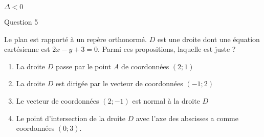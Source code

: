 \begin{enumerate}[label=\alph*.]
     \begin{center}
          \begin{extern} %
          \end{extern}
     \end{center}
     \begin{center}
          $ \Delta <0$
     \end{center}
     \newpar
\end{enumerate}
\begin{h2}Question 5\end{h2}
Le plan est rapporté à un repère orthonormé.
\newpar
$D$ est une droite dont une équation cartésienne est $2x-y+3=0$.
\newpar
Parmi ces propositions, laquelle est juste ?
\newpar
\begin{enumerate}[label=\alph*.]
     \item
     La droite $D$ passe par le point $A$ de coordonnées $( 2;1 )$
     \item
     La droite $D$ est dirigée par le vecteur de coordonnées $(  - 1;2 )$
     \item
     Le vecteur de coordonnées $( 2; - 1 )$ est normal à la droite $D$
     \item
     Le point d'intersection de la droite  $D$ avec l'axe des abscisses a comme coordonnées $( 0;3 ).$
\end{enumerate}
